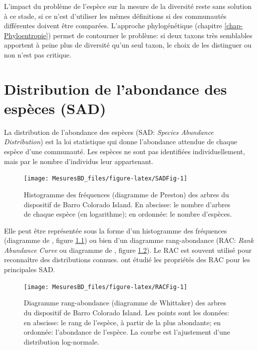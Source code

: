 \documentclass[
  11pt,
  american,
  a4paper,
  extrafontsizes,onecolumn,openright
  ]{memoir}
\begin{document}
L'impact du problème de l'espèce sur la mesure de la diversité reste sans solution à ce stade, si ce n'est d'utiliser les mêmes définitions si des communautés différentes doivent être comparées.
L'approche phylogénétique (chapitre \ref{chap-Phyloentropie}) permet de contourner le problème: si deux taxons très semblables apportent à peine plus de diversité qu'un seul taxon, le choix de les distinguer ou non n'est pas critique.

\hypertarget{distribution-de-labondance-des-espuxe8ces-sad}{%
\chapter{Distribution de l'abondance des espèces (SAD)}\label{distribution-de-labondance-des-espuxe8ces-sad}}

La distribution de l'abondance des espèces (SAD: \emph{Species Abundance Distribution}) est la loi statistique qui donne l'abondance attendue de chaque espèce d'une communauté.
Les espèces ne sont pas identifiées individuellement, mais par le nombre d'individus leur appartenant.



\scriptsize

\begin{figure}

{\centering \texttt{[image: MesuresBD\_files/figure-latex/SADFig-1]} 

}

\caption{Histogramme des fréquences (diagramme de Preston) des arbres du dispositif de Barro Colorado Island. En abscisse: le nombre d'arbres de chaque espèce (en logarithme); en ordonnée: le nombre d'espèces.}\label{fig:SADFig}
\end{figure}

\normalsize

Elle peut être représentée sous la forme d'un histogramme des fréquences (diagramme de \textcite{Preston1948}, figure \ref{fig:SADFig}) ou bien d'un diagramme rang-abondance (RAC: \emph{Rank Abundance Curve} ou diagramme de \textcite{Whittaker1965}, figure \ref{fig:RACFig}).
Le RAC est souvent utilisé pour reconnaître des distributions connues.
\textcite{Izsak2012} ont étudié les propriétés des RAC pour les principales SAD.



\scriptsize

\begin{figure}

{\centering \texttt{[image: MesuresBD\_files/figure-latex/RACFig-1]} 

}

\caption{Diagramme rang-abondance (diagramme de Whittaker) des arbres du dispositif de Barro Colorado Island. Les points sont les données: en abscisse: le rang de l'espèce, à partir de la plus abondante; en ordonnée: l'abondance de l'espèce. La courbe est l'ajustement d'une distribution log-normale.}\label{fig:RACFig}
\end{figure}
\end{document}
